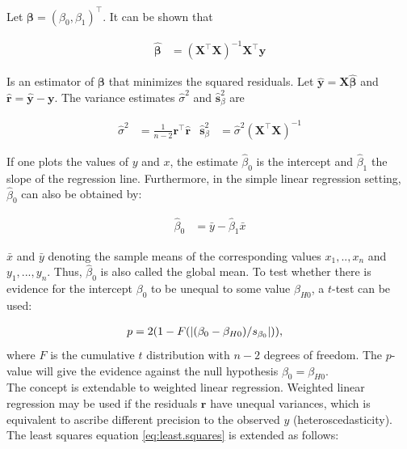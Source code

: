 \documentclass[11pt,a4paper,twoside]{book}\usepackage[]{graphicx}\usepackage[]{color}
\begin{document}
\vspace{2mm}

Let $\mathbf{\beta} = (\beta_0, \beta_1)^\top$. It can be shown that 

\begin{align}
\hat{\mathbf{\beta}} &= (\mathbf{X}^\top \mathbf{X})^{-1} \mathbf{X}^\top \mathbf{y} \label{eq:regression.parameters}
\end{align}

Is an estimator of $\mathbf{\beta}$ that minimizes the squared residuals. Let $\hat{\mathbf{y}} = \mathbf{X}\hat{\mathbf{\beta}}$ and $\hat{\mathbf{r}} = \hat{\mathbf{y}} - \mathbf{y}$. The variance estimates $\hat{\sigma}^2$ and $\hat{\mathbf{s}}_\beta^2$ are

\begin{align}
\hat{\sigma}^2 &= \frac{1}{n-2}\mathbf{r}^\top \hat{\mathbf{r}} & \hat{\mathbf{s}}_\beta^2 &= \hat{\sigma}^2 (\mathbf{X}^\top \mathbf{X})^{-1} \label{eq:regression.variances}
\end{align}

If one plots the values of $y$ and $x$, the estimate $\hat{\beta}_0$ is the intercept and $\hat{\beta}_1$ the slope of the regression line. Furthermore, in the simple linear regression setting, $\hat{\beta}_0$ can also be obtained by:

\begin{align}
\hat{\beta}_0 &= \bar{y} - \hat{\beta}_1 \bar{x} \nonumber
\end{align}

$\bar{x}$ and $\bar{y}$ denoting the sample means of the corresponding values $x_1, .., x_n$ and $y_1, ..., y_n$. Thus, $\hat{\beta}_0$ is also called the global mean.
To test whether there is evidence for the intercept $\beta_0$ to be unequal to some value $\beta_{H0}$, a $t$-test can be used:

\begin{align}
p &= 2(1-F(\left\lvert(\beta_0 - \beta_{H0})/s_{\beta_0}\right\rvert)), \nonumber
\end{align}
where $F$ is the cumulative $t$ distribution with $n-2$ degrees of freedom. The  $p$\hspace{0.4mm}-value will give the evidence against the null hypothesis $\beta_0 = \beta_{H0}$. \\
The concept is extendable to weighted linear regression. Weighted linear regression may be used if the residuals $\mathbf{r}$ have unequal variances, which is equivalent to ascribe different precision to the observed $y$ (heteroscedasticity). The least squares equation \eqref{eq:least.squares} is extended as follows:
\end{document}
